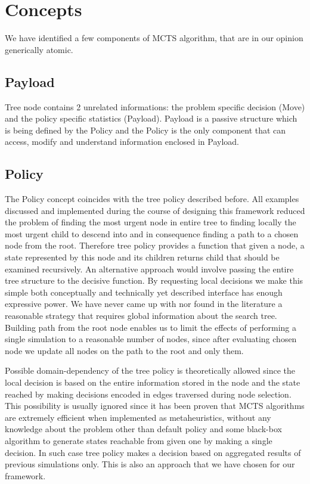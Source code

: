 \section{Concepts}
We have identified a few components of MCTS algorithm, that are in our
opinion generically atomic.

\subsection{Payload}
Tree node contains 2 unrelated informations: the problem specific decision (Move)
and the policy specific statistics (Payload).
Payload is a passive structure which is being defined by the Policy
and the Policy is the only component that can access,
modify and understand information enclosed in Payload.

\subsection{Policy}
The Policy concept coincides with the tree policy described before.
All examples discussed and implemented during the course of designing this
framework reduced the problem of finding the most urgent node in entire tree to
finding locally the most urgent child to descend into and in consequence
finding a path to a chosen node from the root. Therefore tree policy provides a
function that given a node, a state represented by this node and its children
returns child that should be examined recursively. An alternative approach would
involve passing the entire tree structure to the decisive function. By requesting
local decisions we make this simple both conceptually and technically yet
described interface has enough expressive power. We have never came up with nor
found in the literature a reasonable strategy that requires global information
about the search tree.
Building path from the root node enables us to limit the effects of performing
a single simulation to a reasonable number of nodes, since after evaluating chosen
node we update all nodes on the path to the root and only them.

Possible domain-dependency of the tree policy is theoretically allowed since
the local decision is based on the entire information stored in the node and the
state reached by making decisions encoded in edges traversed during node
selection.
This possibility is usually ignored since it has been proven that MCTS
algorithms are extremely efficient when implemented as metaheuristics, without
any knowledge about the problem other than default policy and some black-box
algorithm to generate states reachable from given one by making a single
decision. In such case tree policy makes a decision based on aggregated results
of previous simulations only.
This is also an approach that we have chosen for our framework.

